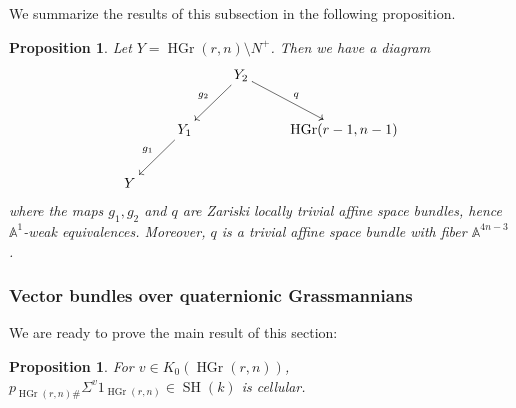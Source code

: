 \documentclass[10pt]{amsart}
\theoremstyle{definition}
\theoremstyle{plain}
\newtheorem{prop}[defn]{Proposition}
\numberwithin{equation}{section}
\newcommand{\0}{\emptyset}
\newcommand{\HGr}{{\operatorname{HGr}}}
\newcommand{\SH}{{\operatorname{SH}}}
\begin{document}
We summarize the results of this subsection in the following proposition.
\begin{prop} \label{prop:summary}
Let $Y=\HGr(r,n)\setminus N^+$. Then  we have a diagram
\[
\xymatrix{
 &&Y_2 \ar[dl]_{g_2} \ar[dr]^q& \\
    &Y_1 \ar[dl]_{g_1}&&\HGr(r-1,n-1)\\
    Y &&&
 }
 \]
where the maps $g_1,g_2$ and $q$ are Zariski locally trivial affine space bundles, hence $\mathbb{A}^1$-weak equivalences. Moreover, $q$ is a trivial affine space bundle with fiber $\mathbb{A}^{4n-3}$.
\end{prop}  

\subsubsection{Vector bundles over quaternionic Grassmannians}

We are ready to prove the main result of this section:

\begin{prop}
\label{prop:bundlesonHGr}
    For $v\in K_0(\HGr(r,n))$, $p_{\HGr(r,n)\#}\Sigma^v1_{\HGr(r,n)}\in \SH(k)$ is cellular.
\end{prop}
\end{document}
